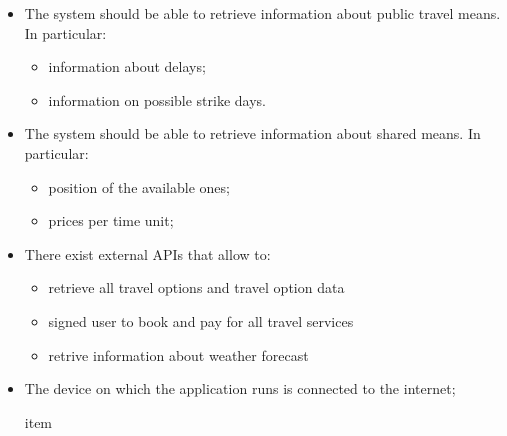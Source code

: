 \begin{itemize}
\item The system should be able to retrieve information about public travel means. In particular:
\begin{itemize}
\item information about delays;
\item information on possible strike days.
\end{itemize}

\item The system should be able to retrieve information about shared means. In particular:
\begin{itemize}
\item position of the available ones;
\item prices per time unit;
\end{itemize}

\item There exist external APIs that allow to:
\begin{itemize}
\item retrieve all travel options and travel option data
\item signed user to book and pay for all travel services
\item retrive information about weather forecast
\end{itemize}


\item The device on which the application runs is connected to the internet;

item 

\end{itemize}




